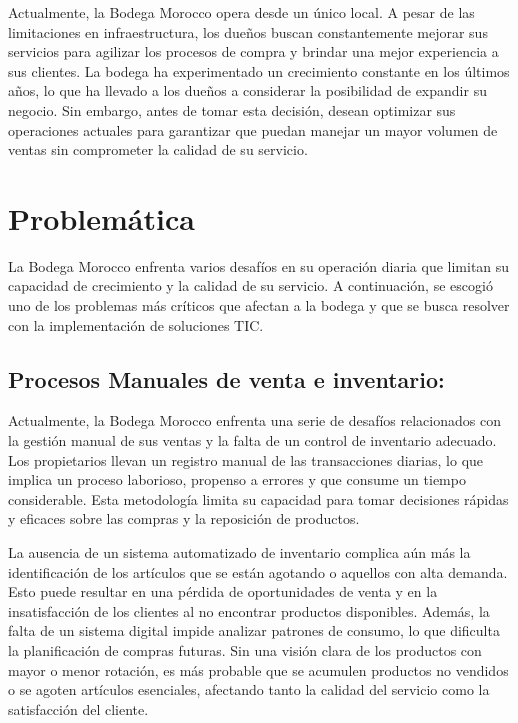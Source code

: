 \documentclass{article}
\begin{document}
  Actualmente, la Bodega Morocco opera desde un único local. A pesar de las limitaciones en infraestructura, los dueños buscan constantemente mejorar sus servicios para agilizar los procesos de compra y brindar una mejor experiencia a sus clientes. La bodega ha experimentado un crecimiento constante en los últimos años, lo que ha llevado a los dueños a considerar la posibilidad de expandir su negocio. Sin embargo, antes de tomar esta decisión, desean optimizar sus operaciones actuales para garantizar que puedan manejar un mayor volumen de ventas sin comprometer la calidad de su servicio.

\section{Problemática}

  La Bodega Morocco enfrenta varios desafíos en su operación diaria que limitan su capacidad de crecimiento y la calidad de su servicio. A continuación, se escogió uno de los problemas más críticos que afectan a la bodega y que se busca resolver con la implementación de soluciones TIC.

  \subsection{Procesos Manuales de venta e inventario:}

  Actualmente, la Bodega Morocco enfrenta una serie de desafíos relacionados con la gestión manual de sus ventas y la falta de un control de inventario adecuado. Los propietarios llevan un registro manual de las transacciones diarias, lo que implica un proceso laborioso, propenso a errores y que consume un tiempo considerable. Esta metodología limita su capacidad para tomar decisiones rápidas y eficaces sobre las compras y la reposición de productos.

  La ausencia de un sistema automatizado de inventario complica aún más la identificación de los artículos que se están agotando o aquellos con alta demanda. Esto puede resultar en una pérdida de oportunidades de venta y en la insatisfacción de los clientes al no encontrar productos disponibles. Además, la falta de un sistema digital impide analizar patrones de consumo, lo que dificulta la planificación de compras futuras. Sin una visión clara de los productos con mayor o menor rotación, es más probable que se acumulen productos no vendidos o se agoten artículos esenciales, afectando tanto la calidad del servicio como la satisfacción del cliente.
\end{document}
